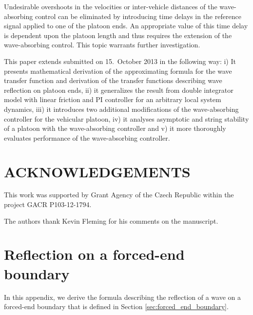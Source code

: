 \documentclass[final,5p,times,twocolumn]{elsarticle}
\begin{document}
Undesirable overshoots in the velocities or inter-vehicle distances of the wave-absorbing control can be eliminated by introducing time delays in the reference signal applied to one of the platoon ends. An appropriate value of this time delay is dependent upon the platoon length and thus requires the extension of the wave-absorbing control. This topic warrants further investigation.

This paper extends \cite{Martinec2014} submitted on 15.~October 2013 in the following way: i) It presents mathematical derivation of the approximating formula for the wave transfer function and derivation of the transfer functions describing wave reflection on platoon ends, ii) it generalizes the result from double integrator model with linear friction and PI controller for an arbitrary local system dynamics, iii) it introduces two additional modifications of the wave-absorbing controller for the vehicular platoon, iv) it analyses asymptotic and string stability of a platoon with the wave-absorbing controller and v) it more thoroughly evaluates performance of the wave-absorbing controller.


\section{ACKNOWLEDGEMENTS}
This work was supported by Grant Agency of the Czech Republic within the project GACR P103-12-1794.

The authors thank Kevin Fleming for his comments on the manuscript.

\appendix
\section{Reflection on a forced-end boundary}
\label{sec:app_forced_end}
In this appendix, we derive the formula describing the reflection of a wave on a forced-end boundary that is defined in Section \ref{sec:forced_end_boundary}.
\end{document}
